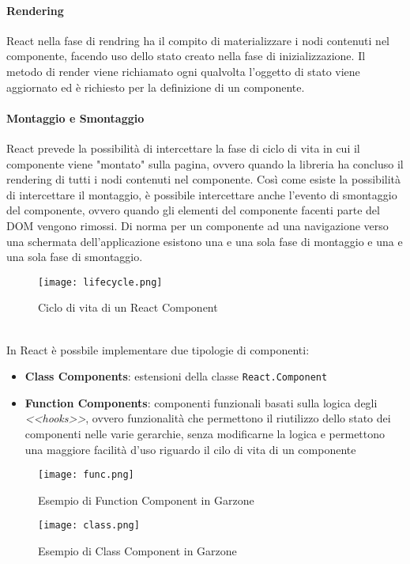 \paragraph{Rendering} React nella fase di rendring ha il compito di materializzare i nodi contenuti nel componente, facendo uso dello stato creato nella fase di inizializzazione. Il metodo di render viene richiamato ogni qualvolta l'oggetto di stato viene aggiornato ed è richiesto per la definizione di un componente.
\paragraph{Montaggio e Smontaggio} React prevede la possibilità di intercettare la fase di ciclo di vita in cui il componente viene "montato" sulla pagina, ovvero quando la libreria ha concluso il rendering di tutti i nodi contenuti nel componente. Così come esiste la possibilità di intercettare il montaggio, è possibile intercettare anche l'evento di smontaggio del componente, ovvero quando gli elementi del componente facenti parte del DOM vengono rimossi. Di norma per un componente ad una navigazione verso una schermata dell'applicazione esistono una e una sola fase di montaggio e una e una sola fase di smontaggio.
\begin{figure}[!htb]
    \centering
    \texttt{[image: lifecycle.png]}
    \caption{Ciclo di vita di un React Component\cite{LIFE}}
\end{figure}
\\[12pt]
In React è possbile implementare due tipologie di componenti:
\begin{itemize}
    \item \textbf{Class Components}: estensioni della classe \lstinline[basicstyle=\ttfamily]!React.Component!
    \item \textbf{Function Components}: componenti funzionali basati sulla logica degli \textit{<<hooks>>}, ovvero funzionalità che permettono il riutilizzo dello stato dei componenti nelle varie gerarchie, senza modificarne la logica e permettono una maggiore facilità d'uso riguardo il cilo di vita di un componente
\end{itemize} 
\begin{figure}[!htb]
    \centering
    \texttt{[image: func.png]}
    \caption{Esempio di Function Component in Garzone}
\end{figure}
\begin{figure}[!htb]
    \centering
    \texttt{[image: class.png]}
    \caption{Esempio di Class Component in Garzone}
\end{figure}
